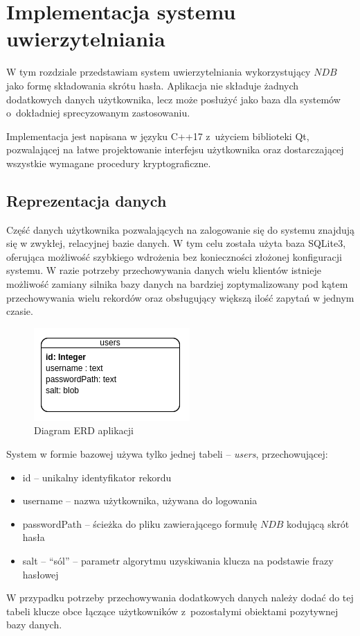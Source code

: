 
\chapter{Implementacja systemu uwierzytelniania}
\label{chp:implementation}
W tym rozdziale przedstawiam system uwierzytelniania wykorzystujący $NDB$ jako formę składowania skrótu hasła. 
Aplikacja nie składuje żadnych dodatkowych danych użytkownika, lecz może posłużyć jako baza dla systemów o~dokładniej sprecyzowanym zastosowaniu.

Implementacja jest napisana w języku C++17 z~użyciem biblioteki Qt, pozwalającej na łatwe projektowanie interfejsu użytkownika oraz dostarczającej
wszystkie wymagane procedury kryptograficzne.
\section{Reprezentacja danych}
Część danych użytkownika pozwalających na zalogowanie się do systemu znajdują się w zwykłej, relacyjnej bazie danych.
W tym celu została użyta baza SQLite3, oferująca możliwość szybkiego wdrożenia bez konieczności złożonej konfiguracji systemu.
W razie potrzeby przechowywania danych wielu klientów istnieje możliwość zamiany silnika bazy danych na bardziej 
zoptymalizowany pod kątem przechowywania wielu rekordów oraz obsługujący większą ilość zapytań w jednym czasie.


\begin{figure}[h]
    \includegraphics{img/diagrams/erd.png}
    \centering
    \caption{Diagram ERD aplikacji}
    \label{img:erd}
\end{figure}

System w formie bazowej używa tylko jednej tabeli -- \textit{users}, przechowującej:
\begin{itemize}
    \item id -- unikalny identyfikator rekordu
    \item username -- nazwa użytkownika, używana do logowania
    \item passwordPath -- ścieżka do pliku zawierającego formułę $NDB$ kodującą skrót hasła
    \item salt -- \enquote{sól} -- parametr algorytmu uzyskiwania klucza na podstawie frazy hasłowej
\end{itemize}
W przypadku potrzeby przechowywania dodatkowych danych należy dodać do tej tabeli klucze obce łączące użytkowników z~pozostałymi obiektami pozytywnej bazy danych.

